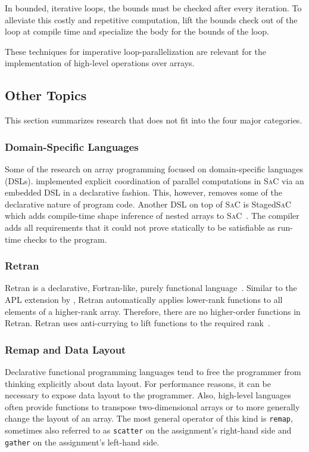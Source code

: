 \documentclass[a4paper]{article}
\newcommand{\sac}{S\textsc{a}C}
\begin{document}
In bounded, iterative loops, the bounds must be checked after every iteration. To alleviate this costly and repetitive computation, \citet{Henriksen:2014:BCI:2627373.2627388} lift the bounds check out of the loop at compile time and specialize the body for the bounds of the loop.

These techniques for imperative loop-parallelization are relevant for the implementation of high-level operations over arrays.

\subsection{Other Topics}
\label{sec:other-topics}

This section summarizes research that does not fit into the four major categories.

\subsubsection{Domain-Specific Languages}

Some of the research on array programming focused on domain-specific languages (DSLs). \citet{4228136} implemented explicit coordination of parallel computations in \sac{} via an embedded DSL in a declarative fashion. This, however, removes some of the declarative nature of program code. Another DSL on top of \sac{} is Staged\sac{} which adds compile-time shape inference of nested arrays to \sac{}~\cite{Ureche:2012:SCS:2103746.2103762}. The compiler adds all requirements that it could not prove statically to be satisfiable as run-time checks to the program.

\subsubsection{Retran}

Retran is a declarative, Fortran-like, purely functional language~\cite{367042}. Similar to the APL extension by \citet{Lowney:1981:CAI:567532.567533}, Retran automatically applies lower-rank functions to all elements of a higher-rank array. Therefore, there are no higher-order functions in Retran. Retran uses anti-currying to lift functions to the required rank~\cite{367042}.

\subsubsection{Remap and Data Layout}

Declarative functional programming languages tend to free the programmer from thinking explicitly about data layout. For performance reasons, it can be necessary to expose data layout to the programmer. Also, high-level languages often provide functions to transpose two-dimensional arrays or to more generally change the layout of an array. The most general operator of this kind is \texttt{remap}, sometimes also referred to as \texttt{scatter} on the assignment's right-hand side and \texttt{gather} on the assignment's left-hand side.
\end{document}
